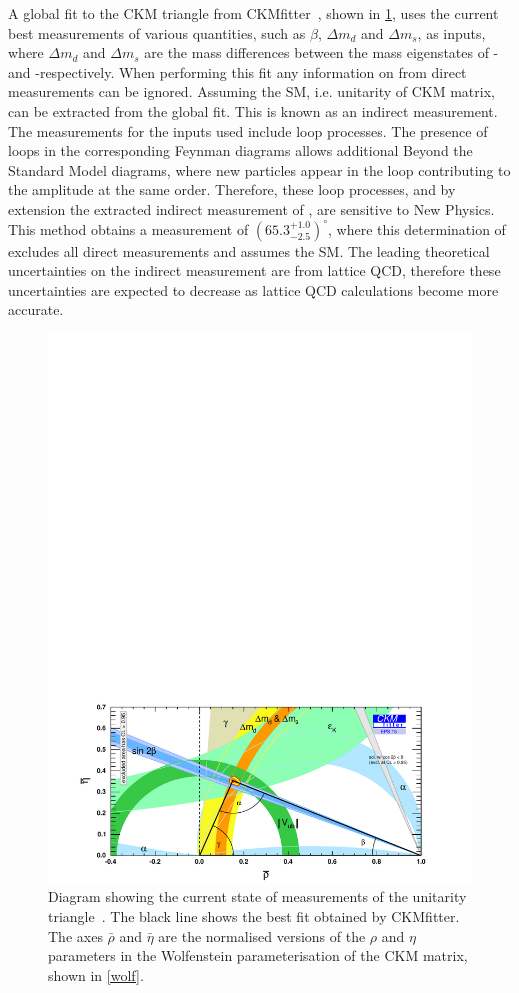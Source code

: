 A global fit to the CKM triangle from CKMfitter~\cite{CKMFitter}, shown in \fig\ref{globalfit}, uses the current best measurements of various quantities, such as $\beta$, $\Delta m_d$ and $\Delta m_s$, as inputs, where $\Delta m_d$ and $\Delta m_s$ are the mass differences between the mass eigenstates of \Bz-\Bzb and \Bs-\Bsb respectively. When performing this fit any information on \Pgamma from direct measurements can be ignored. Assuming the SM, i.e. unitarity of CKM matrix, \Pgamma can be extracted from the global fit. This is known as an indirect measurement. The measurements for the inputs used include loop processes. The presence of loops in the corresponding Feynman diagrams allows additional Beyond the Standard Model diagrams, where new particles appear in the loop contributing to the amplitude at the same order. Therefore, these loop processes, and by extension the extracted indirect measurement of \Pgamma, are sensitive to New Physics. This method obtains a \Pgamma measurement of $(65.3^{+1.0}_{-2.5})^{\circ}$, where this determination of \Pgamma excludes all direct measurements and assumes the SM. The leading theoretical uncertainties on the indirect measurement are from lattice QCD, therefore these uncertainties are expected to decrease as lattice QCD calculations become more accurate. 
\begin{figure}[!ht]
\centering
\includegraphics[trim = 0mm 0mm 0mm 180mm,clip,width=0.9\linewidth]{figures/theory/rhoeta_small_global.pdf}
\caption{Diagram showing the current state of measurements of the unitarity triangle~\cite{CKMFitter}. The black line shows the best fit obtained by CKMfitter. The axes $\bar{\rho}$ and $\bar{\eta}$ are the normalised versions of the $\rho$ and $\eta$ parameters in the Wolfenstein parameterisation of the CKM matrix, shown in \eqn\ref{wolf}.}
\label{globalfit}
\end{figure}

